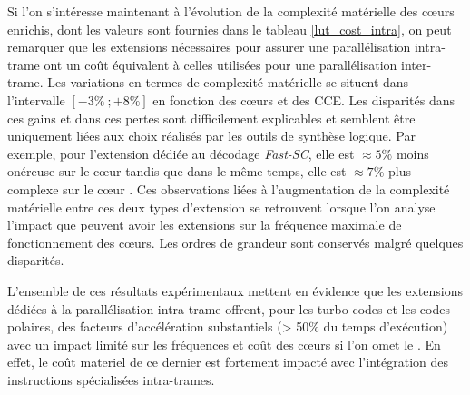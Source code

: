 \documentclass[../main.tex]{subfiles}
\begin{document}
Si l'on s'intéresse maintenant à l'évolution de la complexité matérielle des cœurs enrichis, dont les valeurs sont fournies dans le tableau \ref{lut_cost_intra}, on peut remarquer que les extensions nécessaires pour assurer une parallélisation intra-trame ont un coût équivalent à celles utilisées pour une parallélisation inter-trame. 
Les variations en termes de complexité matérielle se situent dans l'intervalle $[-3\%\ ; +8\%]$ en fonction des cœurs et des CCE. 
Les disparités dans ces gains et dans ces pertes sont difficilement explicables et semblent être uniquement liées aux choix réalisés par les outils de synthèse logique. 
Par exemple, pour l'extension dédiée au décodage \textit{Fast-SC}, elle est $\approx 5\%$ moins onéreuse sur le cœur \PicoRV\space tandis que dans le même temps, elle est $\approx 7\%$ plus complexe sur le cœur \IBEX.
Ces observations liées à l'augmentation de la complexité matérielle entre ces deux types d'extension se retrouvent lorsque l'on analyse l'impact que peuvent avoir les extensions sur la fréquence maximale de fonctionnement des cœurs. 
Les ordres de grandeur sont conservés malgré quelques disparités.

L'ensemble de ces résultats expérimentaux mettent en évidence que les extensions dédiées à la parallélisation intra-trame offrent, pour les turbo codes et les codes polaires, des facteurs d'accélération substantiels (> 50\% du temps d'exécution) avec un impact limité sur les fréquences et coût des cœurs si l'on omet le \PicoRV. En effet, le coût materiel de ce dernier est fortement impacté avec l'intégration des instructions spécialisées intra-trames.




%
%
%
%
\end{document}
